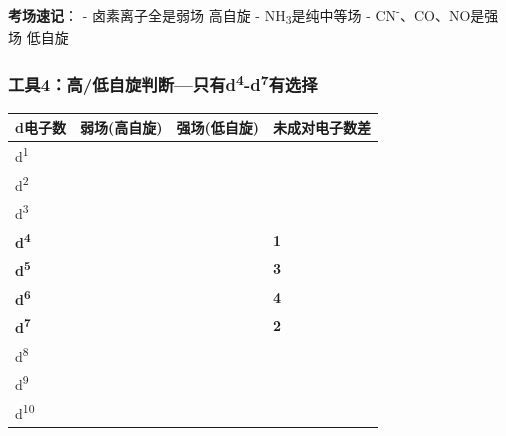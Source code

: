 \textbf{考场速记}：
- 卤素离子全是 \箭 弱场 \箭 高自旋
- NH\textsubscript{3}是纯 \箭 中等场
- CN\textsuperscript{-}、CO、NO是 \箭 强场 \箭 低自旋

\subsubsection{\texorpdfstring{工具4：高/低自旋判断---只有d\textsuperscript{4}-d\textsuperscript{7}有选择}{工具4：高/低自旋判断---只有d4-d7有选择}}\label{ux5de5ux51774ux9ad8ux4f4eux81eaux65cbux5224ux65adux53eaux6709d4-d7ux6709ux9009ux62e9}

{\def\LTcaptype{none} %
\begin{longtable}[]{@{}
  >{\centering\arraybackslash}p{}
  >{\centering\arraybackslash}p{}
  >{\centering\arraybackslash}p{}
  >{\centering\arraybackslash}p{}@{}}
\toprule\noalign{}
\begin{minipage}[b]{\linewidth}\centering
d电子数
\end{minipage} & \begin{minipage}[b]{\linewidth}\centering
弱场(高自旋)
\end{minipage} & \begin{minipage}[b]{\linewidth}\centering
强场(低自旋)
\end{minipage} & \begin{minipage}[b]{\linewidth}\centering
未成对电子数差
\end{minipage} \\
\midrule\noalign{}
\endhead
\bottomrule\noalign{}
\endlastfoot
d\textsuperscript{1} &  &  & 0 \\
d\textsuperscript{2} &  &  & 0 \\
d\textsuperscript{3} &  &  & 0 \\
\textbf{d\textsuperscript{4}} &  &  & \textbf{1} \\
\textbf{d\textsuperscript{5}} &  &  & \textbf{3} \\
\textbf{d\textsuperscript{6}} &  &  & \textbf{4} \\
\textbf{d\textsuperscript{7}} &  &  & \textbf{2} \\
d\textsuperscript{8} &  &  & 0 \\
d\textsuperscript{9} &  &  & 0 \\
d\textsuperscript{10} &  &  & 0 \\
\end{longtable}
}

